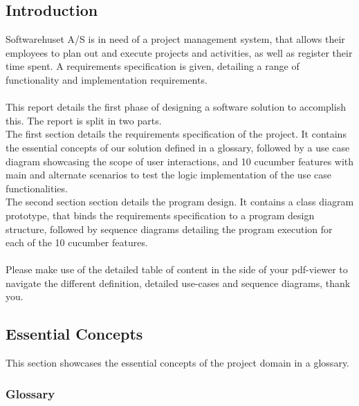 \subsection{Introduction}
\noindent Softwarehuset A/S is in need of a project management system, that allows their employees to plan out and execute projects and activities, as well as register their time spent. A requirements specification is given, detailing a range of functionality and implementation requirements.
\\\\
This report details the first phase of designing a software solution to accomplish this. The report is split in two parts.\\
The first section details the requirements specification of the project. It contains the essential concepts of our solution defined in a glossary, followed by a use case diagram showcasing the scope of user interactions, and 10 cucumber features with main and alternate scenarios to test the logic implementation of the use case functionalities.\\
The second section section details the program design. It contains a class diagram prototype, that binds the requirements specification to a program design structure, followed by sequence diagrams detailing the program execution for each of the 10 cucumber features.\\
\\
Please make use of the detailed table of content in the side of your pdf-viewer to navigate the different definition, detailed use-cases and sequence diagrams, thank you.

\subsection{Essential Concepts}
\noindent This section showcases the essential concepts of the project domain in a glossary.

\subsubsection{Glossary}  %
